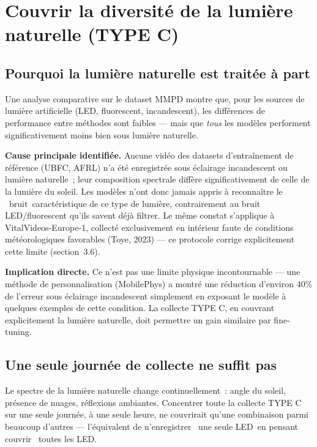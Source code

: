 \documentclass[11pt,a4paper]{article}
\begin{document}
\newpage
\section{Couvrir la diversit\'e de la lumi\`ere naturelle (TYPE C)}

\subsection{Pourquoi la lumi\`ere naturelle est trait\'ee \`a part}

Une analyse comparative sur le dataset MMPD montre que, pour les sources de
lumi\`ere artificielle (LED, fluorescent, incandescent), les diff\'erences
de performance entre m\'ethodes sont faibles --- mais que \emph{tous} les
mod\`eles performent significativement moins bien sous lumi\`ere naturelle.

\textbf{Cause principale identifi\'ee.} Aucune vid\'eo des datasets
d'entra\^inement de r\'ef\'erence (UBFC, AFRL) n'a \'et\'e enregistr\'ee sous
\'eclairage incandescent ou lumi\`ere naturelle~; leur composition spectrale
diff\`ere significativement de celle de la lumi\`ere du soleil. Les
mod\`eles n'ont donc jamais appris \`a reconna\^itre le
\guillemotleft~bruit\guillemotright\ caract\'eristique de ce type de
lumi\`ere, contrairement au bruit LED/fluorescent qu'ils savent d\'ej\`a
filtrer. Le m\^eme constat s'applique \`a VitalVideos-Europe-1, collect\'e
exclusivement en int\'erieur faute de conditions m\'et\'eorologiques
favorables (Toye, 2023) --- ce protocole corrige explicitement cette
limite (section~3.6).

\textbf{Implication directe.} Ce n'est pas une limite physique
incontournable --- une m\'ethode de personnalisation (MobilePhys) a
montr\'e une r\'eduction d'environ 40\% de l'erreur sous \'eclairage
incandescent simplement en exposant le mod\`ele \`a quelques exemples de
cette condition. La collecte TYPE C, en couvrant explicitement la lumi\`ere
naturelle, doit permettre un gain similaire par fine-tuning.

\subsection{Une seule journ\'ee de collecte ne suffit pas}

Le spectre de la lumi\`ere naturelle change continuellement~: angle du
soleil, pr\'esence de nuages, r\'eflexions ambiantes. Concentrer toute la
collecte TYPE C sur une seule journ\'ee, \`a une seule heure, ne couvrirait
qu'une combinaison parmi beaucoup d'autres --- l'\'equivalent de
n'enregistrer \guillemotleft~une seule LED\guillemotright\ en pensant
couvrir \guillemotleft~toutes les LED\guillemotright.
\end{document}
